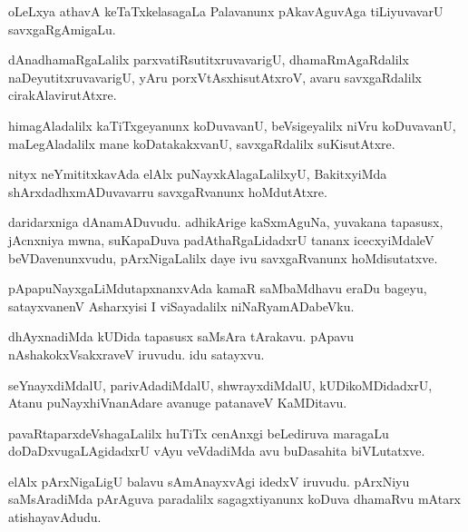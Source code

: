 \documentclass{article}
\begin{document}
\begin{mn}%
oLeLxya athavA keTaTxkelasagaLa Palavanunx pAkavAguvAga tiLiyuvavarU savxgaRgAmigaLu.
\end{mn}

\begin{mn}%
dAnadhamaRgaLalilx parxvatiRsutitxruvavarigU, dhamaRmAgaRdalilx naDeyutitxruvavarigU, yAru 
porxVtAsxhisutAtxroV, avaru savxgaRdalilx cirakAlavirutAtxre.
\end{mn}

\begin{mn}%
himagAladalilx kaTiTxgeyanunx koDuvavanU, beVsigeyalilx niVru koDuvavanU, maLegAladalilx 
mane koDatakakxvanU, savxgaRdalilx suKisutAtxre.
\end{mn}

\begin{mn}%
nityx neYmititxkavAda elAlx puNayxkAlagaLalilxyU, BakitxyiMda shArxdadhxmADuvavarru 
savxgaRvanunx hoMdutAtxre.
\end{mn}

\begin{mn}%
daridarxniga dAnamADuvudu. adhikArige kaSxmAguNa, yuvakana tapasusx, jAcnxniya mwna, 
suKapaDuva padAthaRgaLidadxrU tananx icecxyiMdaleV beVDavenunxvudu, pArxNigaLalilx daye 
ivu savxgaRvanunx hoMdisutatxve.
\end{mn}

\begin{mn}%
pApapuNayxgaLiMdutapxnanxvAda kamaR saMbaMdhavu eraDu bageyu, satayxvanenV Asharxyisi I 
viSayadalilx niNaRyamADabeVku.
\end{mn}

\begin{mn}%
dhAyxnadiMda kUDida tapasusx saMsAra tArakavu. pApavu nAshakokxVsakxraveV iruvudu. idu 
satayxvu.
\end{mn}

\begin{mn}%
seYnayxdiMdalU, parivAdadiMdalU, shwrayxdiMdalU, kUDikoMDidadxrU, Atanu puNayxhiVnanAdare 
avanuge patanaveV KaMDitavu.
\end{mn}

\begin{mn}%
pavaRtaparxdeVshagaLalilx huTiTx cenAnxgi beLediruva maragaLu doDaDxvugaLAgidadxrU vAyu 
veVdadiMda avu buDasahita biVLutatxve.
\end{mn}

\begin{mn}%
elAlx pArxNigaLigU balavu sAmAnayxvAgi idedxV iruvudu. pArxNiyu saMsAradiMda pArAguva 
paradalilx sagagxtiyanunx koDuva dhamaRvu mAtarx atishayavAdudu.
\end{mn}
\end{document}
